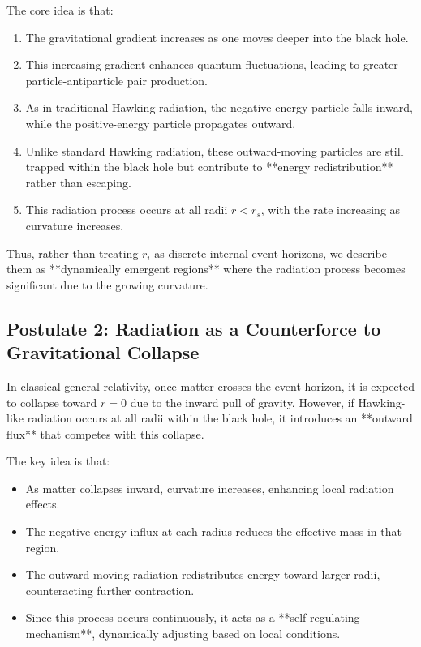 The core idea is that:
\begin{enumerate}
    \item The gravitational gradient increases as one moves deeper into the black hole.
    \item This increasing gradient enhances quantum fluctuations, leading to greater particle-antiparticle pair production.
    \item As in traditional Hawking radiation, the negative-energy particle falls inward, while the positive-energy particle propagates outward.
    \item Unlike standard Hawking radiation, these outward-moving particles are still trapped within the black hole but contribute to **energy redistribution** rather than escaping.
    \item This radiation process occurs at all radii \( r < r_s \), with the rate increasing as curvature increases.
\end{enumerate}

Thus, rather than treating \( r_i \) as discrete internal event horizons, we describe them as **dynamically emergent regions** where the radiation process becomes significant due to the growing curvature.

\subsection{Postulate 2: Radiation as a Counterforce to Gravitational Collapse}

In classical general relativity, once matter crosses the event horizon, it is expected to collapse toward \( r = 0 \) due to the inward pull of gravity. However, if Hawking-like radiation occurs at all radii within the black hole, it introduces an **outward flux** that competes with this collapse.

The key idea is that:
\begin{itemize}
    \item As matter collapses inward, curvature increases, enhancing local radiation effects.
    \item The negative-energy influx at each radius reduces the effective mass in that region.
    \item The outward-moving radiation redistributes energy toward larger radii, counteracting further contraction.
    \item Since this process occurs continuously, it acts as a **self-regulating mechanism**, dynamically adjusting based on local conditions.
\end{itemize}

